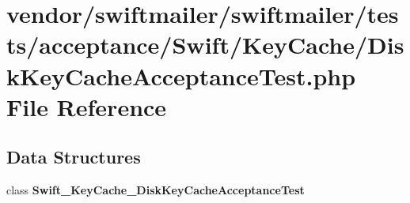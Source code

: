 \section{vendor/swiftmailer/swiftmailer/tests/acceptance/\+Swift/\+Key\+Cache/\+Disk\+Key\+Cache\+Acceptance\+Test.php File Reference}
\label{_disk_key_cache_acceptance_test_8php}
\subsection*{Data Structures}
\begin{DoxyCompactItemize}
\item 
class {\bf Swift\+\_\+\+Key\+Cache\+\_\+\+Disk\+Key\+Cache\+Acceptance\+Test}
\end{DoxyCompactItemize}
